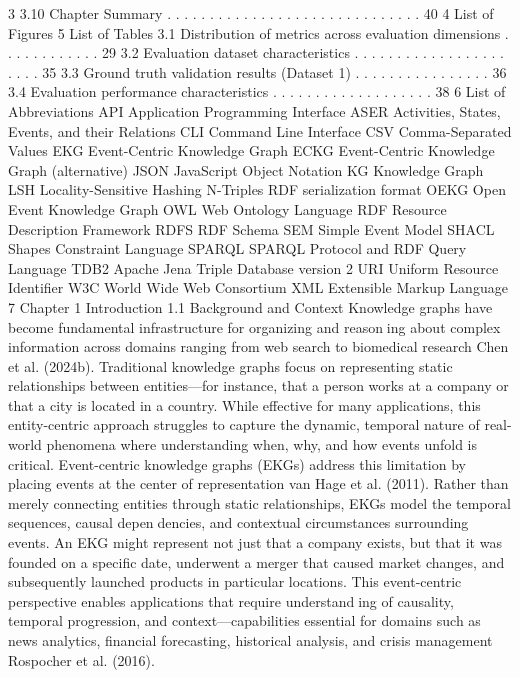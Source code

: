 3
3.10 Chapter Summary . . . . . . . . . . . . . . . . . . . . . . . . . . . . . . 40
4
List of Figures
5
List of Tables
3.1 Distribution of metrics across evaluation dimensions . . . . . . . . . . . . 29
3.2 Evaluation dataset characteristics . . . . . . . . . . . . . . . . . . . . . . 35
3.3 Ground truth validation results (Dataset 1) . . . . . . . . . . . . . . . . 36
3.4 Evaluation performance characteristics . . . . . . . . . . . . . . . . . . . 38
6
List of Abbreviations
API Application Programming Interface
ASER Activities, States, Events, and their Relations
CLI Command Line Interface
CSV Comma-Separated Values
EKG Event-Centric Knowledge Graph
ECKG Event-Centric Knowledge Graph (alternative)
JSON JavaScript Object Notation
KG Knowledge Graph
LSH Locality-Sensitive Hashing
N-Triples RDF serialization format
OEKG Open Event Knowledge Graph
OWL Web Ontology Language
RDF Resource Description Framework
RDFS RDF Schema
SEM Simple Event Model
SHACL Shapes Constraint Language
SPARQL SPARQL Protocol and RDF Query Language
TDB2 Apache Jena Triple Database version 2
URI Uniform Resource Identifier
W3C World Wide Web Consortium
XML Extensible Markup Language
7
Chapter 1
Introduction
1.1 Background and Context
Knowledge graphs have become fundamental infrastructure for organizing and reasoning about complex information across domains ranging from web search to biomedical
research Chen et al. (2024b). Traditional knowledge graphs focus on representing static
relationships between entities—for instance, that a person works at a company or that
a city is located in a country. While effective for many applications, this entity-centric
approach struggles to capture the dynamic, temporal nature of real-world phenomena
where understanding when, why, and how events unfold is critical.
Event-centric knowledge graphs (EKGs) address this limitation by placing events at
the center of representation van Hage et al. (2011). Rather than merely connecting
entities through static relationships, EKGs model the temporal sequences, causal dependencies, and contextual circumstances surrounding events. An EKG might represent not
just that a company exists, but that it was founded on a specific date, underwent a
merger that caused market changes, and subsequently launched products in particular
locations. This event-centric perspective enables applications that require understanding of causality, temporal progression, and context—capabilities essential for domains
such as news analytics, financial forecasting, historical analysis, and crisis management
Rospocher et al. (2016).
